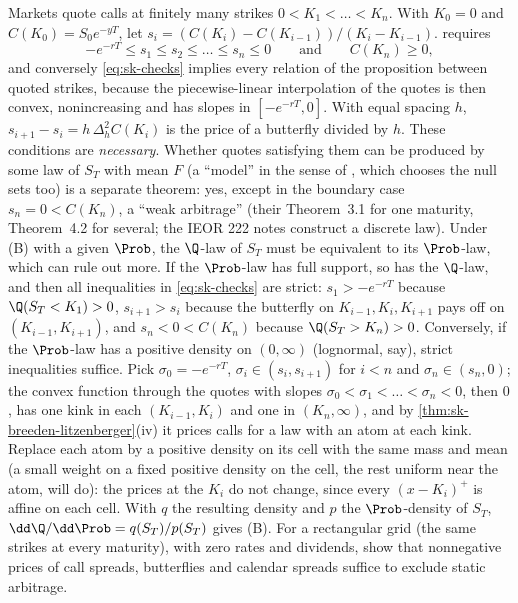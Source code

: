 \begin{remark}\label{rem:sk-finite}
Markets quote calls at finitely many strikes $0<K_1<\dots<K_n$. With $K_0=0$ and $C(K_0)=S_0e^{-yT}$,
let $s_i=(C(K_i)-C(K_{i-1}))/(K_i-K_{i-1})$.  requires
\begin{equation}\label{eq:sk-checks}
  -e^{-rT}\le s_1\le s_2\le\dots\le s_n\le0\qquad\text{and}\qquad C(K_n)\ge0,
\end{equation}
and conversely \eqref{eq:sk-checks} implies every relation of the proposition between quoted strikes,
because the piecewise-linear interpolation of the quotes is then convex, nonincreasing and has
slopes in $[-e^{-rT},0]$. With equal spacing $h$, $s_{i+1}-s_i=h\,\Delta_h^2C(K_i)$ is the price of a
butterfly divided by $h$. These conditions are \emph{necessary}. Whether quotes satisfying them can
be produced by some law of $S_T$ with mean $F$ (a ``model'' in the sense of \textcite{davis-hobson},
which chooses the null sets too) is a separate theorem: yes, except in the boundary case
$s_n=0<C(K_n)$, a ``weak arbitrage'' (their Theorem~3.1 for one maturity, Theorem~4.2 for several;
the IEOR 222 notes construct a discrete law). Under (B) with a given $\Prob$, the $\Q$-law of $S_T$ must
be equivalent to its $\Prob$-law, which can rule out more. If the $\Prob$-law has full support, so has the
$\Q$-law, and then all inequalities in \eqref{eq:sk-checks} are strict: $s_1>-e^{-rT}$ because
$\Q(S_T<K_1)>0$, $s_{i+1}>s_i$ because the butterfly on $K_{i-1},K_i,K_{i+1}$ pays off on
$(K_{i-1},K_{i+1})$, and $s_n<0<C(K_n)$ because $\Q(S_T>K_n)>0$. Conversely, if the $\Prob$-law has a
positive density on $(0,\infty)$ (lognormal, say), strict inequalities suffice. Pick
$\sigma_0=-e^{-rT}$, $\sigma_i\in(s_i,s_{i+1})$ for $i<n$ and $\sigma_n\in(s_n,0)$; the convex function through the
quotes with slopes $\sigma_0<\sigma_1<\dots<\sigma_n<0$, then $0$, has one kink in each $(K_{i-1},K_i)$ and one in
$(K_n,\infty)$, and by \cref{thm:sk-breeden-litzenberger}(iv) it prices calls for a law with an atom at each
kink. Replace each atom by a positive density on its cell with the same mass and mean (a small weight
on a fixed positive density on the cell, the rest uniform near the atom, will do): the prices at the $K_i$ do not change, since every $(x-K_i)^+$ is affine on
each cell. With $q$ the resulting density and $p$ the $\Prob$-density of $S_T$, $\dd\Q/\dd\Prob=q(S_T)/p(S_T)$
gives (B). For a rectangular grid (the same strikes at every maturity), with zero rates and
dividends, \textcite{carr-madan-2005} show that nonnegative prices of call spreads, butterflies and
calendar spreads suffice to exclude static arbitrage.
\end{remark}

